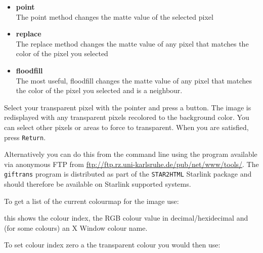 \documentclass[twoside,11pt]{starlink}
\begin{document}
\begin{itemize}
\item{\textbf{point}}\\
The point method changes the matte value of the selected pixel
\item{\textbf{replace}}\\
The replace method changes the matte value of any pixel that matches
the color of the pixel you selected
\item{\textbf{floodfill}}\\
The most useful, floodfill changes the matte value of any pixel that
matches the color of the pixel you selected and is a neighbour.
\end{itemize}

Select your transparent pixel with the pointer and press a button. The
image is redisplayed with any transparent pixels recolored to the
background color. You can select other pixels or areas to force to
transparent. When you are satisfied, press \texttt{Return}.

Alternatively you can do this from the command line using the
program available via anonymous FTP from
\url{ftp://ftp.rz.uni-karlsruhe.de/pub/net/www/tools/}.
The \texttt{giftrans} program is distributed as part of the \texttt{STAR2HTML} Starlink package and should therefore be available on
Starlink supported systems.

To get a list of the current colourmap for the image use:

\begin{small}
\end{small}

this shows the colour index, the RGB colour value in
decimal/hexidecimal and (for some colours) an X Window colour name.

To set colour index zero a the transparent colour you would then use:
\end{document}
